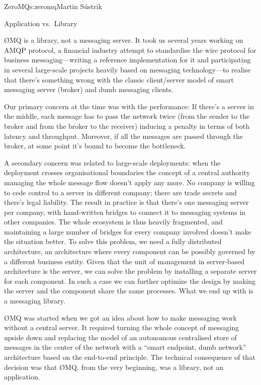 \begin{aosachapter}{ZeroMQ}{s:zeromq}{Martin S\'{u}strik}
\begin{aosasect1}{Application vs.\ Library}

{\O}MQ is a library, not a messaging server. It took us several years
working on AMQP protocol, a financial industry attempt to standardise
the wire protocol for business messaging---writing a reference
implementation for it and participating in several large-scale
projects heavily based on messaging technology---to realise that there's
something wrong with the classic client/server model of smart
messaging server (broker) and dumb messaging clients.

Our primary concern at the time was with the performance: If there's a
server in the middle, each message has to pass the network twice (from
the sender to the broker and from the broker to the receiver) inducing
a penalty in terms of both latency and throughput. Moreover, if all
the messages are passed through the broker, at some point it's bound
to become the bottleneck.

A secondary concern was related to large-scale deployments: when the
deployment crosses organisational boundaries the concept of a central
authority managing the whole message flow doesn't apply any more. No
company is willing to cede control to a server in different
company; there are trade secrets and there's legal liability. The
result in practice is that there's one messaging server per company,
with hand-written bridges to connect it to messaging systems in other
companies. The whole ecosystem is thus heavily fragmented, and
maintaining a large number of bridges for every company involved doesn't
make the situation better. To solve this problem, we need a fully
distributed architecture, an architecture where every component can be
possibly governed by a different business entity. Given that the unit
of management in server-based architecture is the server, we can solve
the problem by installing a separate server for each component. In
such a case we can further optimize the design by making the server and
the component share the same processes. What we end up with is a
messaging library.

{\O}MQ was started when we got an idea about how to make
messaging work without a central server. It required turning the whole
concept of messaging upside down and replacing the model of an autonomous
centralised store of messages in the center of the network with a
``smart endpoint, dumb network'' architecture based on the end-to-end
principle.
The technical consequence of that decision was that {\O}MQ, from the very
beginning, was a library, not an application.


\end{aosasect1}
\end{aosachapter}
